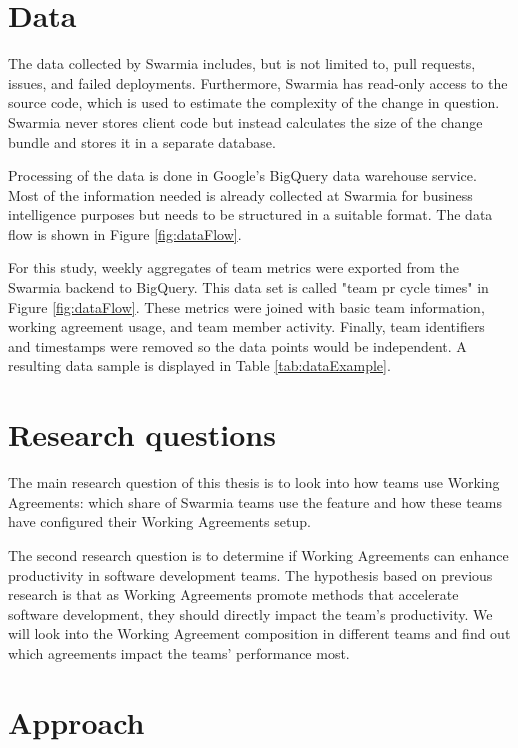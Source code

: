 \section{Data}

The data collected by Swarmia includes, but is not limited to, pull requests, issues, and failed deployments. Furthermore, Swarmia has read-only access to the source code, which is used to estimate the complexity of the change in question. Swarmia never stores client code but instead calculates the size of the change bundle and stores it in a separate database. 

Processing of the data is done in Google's BigQuery data warehouse service. Most of the information needed is already collected at Swarmia for business intelligence purposes but needs to be structured in a suitable format. The data flow is shown in Figure \ref{fig:dataFlow}.





For this study, weekly aggregates of team metrics were exported from the Swarmia backend to BigQuery. This data set is called "team pr cycle times" in Figure \ref{fig:dataFlow}. These metrics were joined with basic team information, working agreement usage, and team member activity. Finally, team identifiers and timestamps were removed so the data points would be independent. A resulting data sample is displayed in Table \ref{tab:dataExample}.

\section{Research questions}

The main research question of this thesis is to look into how teams use Working Agreements: which share of Swarmia teams use the feature and how these teams have configured their Working Agreements setup. 

The second research question is to determine if Working Agreements can enhance productivity in software development teams. The hypothesis based on previous research is that as Working Agreements promote methods that accelerate software development, they should directly impact the team's productivity. We will look into the Working Agreement composition in different teams and find out which agreements impact the teams' performance most. 

\section{Approach}


